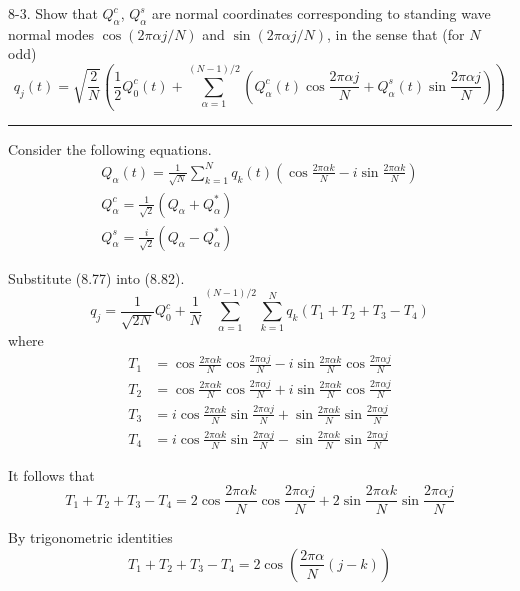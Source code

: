 \documentclass[12pt]{article}
\begin{document}
8-3.
Show that $Q_\alpha^c$, $Q_\alpha^s$ are normal coordinates
corresponding to standing wave normal modes
$\cos(2\pi\alpha j/N)$ and $\sin(2\pi\alpha j/N)$,
in the sense that (for $N$ odd)
\begin{equation*}
q_j(t)=
\sqrt{\frac{2}{N}}\left(
\frac{1}{2}Q_0^c(t)
+\sum_{\alpha=1}^{(N-1)/2}
\left(
Q_\alpha^c(t)\cos\frac{2\pi\alpha j}{N}
+Q_\alpha^s(t)\sin\frac{2\pi\alpha j}{N}
\right)
\right)
\tag{8.82}
\end{equation*}

\bigskip
\hrule

\bigskip
Consider the following equations.
\begin{gather*}
Q_\alpha(t)=\frac{1}{\sqrt N}\sum_{k=1}^Nq_k(t)
\left(
\cos\frac{2\pi\alpha k}{N}-i\sin\frac{2\pi\alpha k}{N}
\right)
\tag{8.77}
\\
Q_\alpha^c=\frac{1}{\sqrt2}(Q_\alpha+Q_\alpha^*)
\tag{8.79}
\\
Q_\alpha^s=\frac{i}{\sqrt2}(Q_\alpha-Q_\alpha^*)
\tag{8.80}
\end{gather*}

Substitute (8.77) into (8.82).
\begin{equation*}
q_j=
\frac{1}{\sqrt{2N}}Q_0^c
+
\frac{1}{N}
\sum_{\alpha=1}^{(N-1)/2}
\sum_{k=1}^N
q_k(T_1+T_2+T_3-T_4)
\tag{1}
\end{equation*}
where
\begin{align*}
T_1&=\cos\frac{2\pi\alpha k}{N}\cos\frac{2\pi\alpha j}{N}
-i\sin\frac{2\pi\alpha k}{N}\cos\frac{2\pi\alpha j}{N}
\\
T_2&=\cos\frac{2\pi\alpha k}{N}\cos\frac{2\pi\alpha j}{N}
+i\sin\frac{2\pi\alpha k}{N}\cos\frac{2\pi\alpha j}{N}
\\
T_3&=i\cos\frac{2\pi\alpha k}{N}\sin\frac{2\pi\alpha j}{N}
+\sin\frac{2\pi\alpha k}{N}\sin\frac{2\pi\alpha j}{N}
\\
T_4&=i\cos\frac{2\pi\alpha k}{N}\sin\frac{2\pi\alpha j}{N}
-\sin\frac{2\pi\alpha k}{N}\sin\frac{2\pi\alpha j}{N}
\end{align*}

It follows that
\begin{equation*}
T_1+T_2+T_3-T_4=
2\cos\frac{2\pi\alpha k}{N}\cos\frac{2\pi\alpha j}{N}
+2\sin\frac{2\pi\alpha k}{N}\sin\frac{2\pi\alpha j}{N}
\end{equation*}

By trigonometric identities
\begin{equation*}
T_1+T_2+T_3-T_4=2\cos\left(\frac{2\pi\alpha}{N}(j-k)\right)
\tag{2}
\end{equation*}
\end{document}
